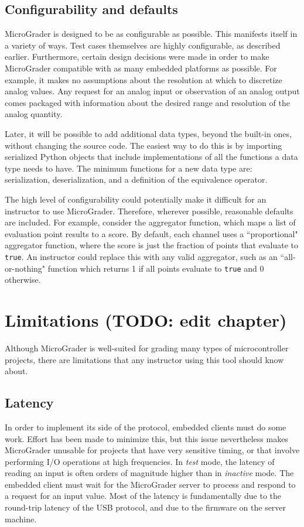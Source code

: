 \documentclass[12pt]{article}
\begin{document}
\subsection{Configurability and defaults}
\label{sec:config}
MicroGrader is designed to be as configurable as possible.  This manifests itself in a variety of ways.  Test cases themselves are highly configurable, as described earlier.  Furthermore, certain design decisions were made in order to make MicroGrader compatible with as many embedded platforms as possible.  For example, it makes no assumptions about the resolution at which to discretize analog values.  Any request for an analog input or observation of an analog output comes packaged with information about the desired range and resolution of the analog quantity.

Later, it will be possible to add additional data types, beyond the built-in ones, without changing the source code.  The easiest way to do this is by importing serialized \cite{pickle} Python objects that include implementations of all the functions a data type needs to have.  The minimum functions for a new data type are: serialization, deserialization, and a definition of the equivalence operator.

The high level of configurability could potentially make it difficult for an instructor to use MicroGrader.  Therefore, wherever possible, reasonable defaults are included.  For example, consider the aggregator function, which maps a list of evaluation point results to a score.  By default, each channel uses a ``proportional" aggregator function, where the score is just the fraction of points that evaluate to \texttt{true}.  An instructor could replace this with any valid aggregator, such as an ``all-or-nothing" function which returns 1 if all points evaluate to \texttt{true} and 0 otherwise.


\newpage
\section{Limitations (TODO: edit chapter)}
Although MicroGrader is well-suited for grading many types of microcontroller projects, there are limitations that any instructor using this tool should know about.

\subsection{Latency}
In order to implement its side of the protocol, embedded clients must do some work.  Effort has been made to minimize this, but this issue nevertheless makes MicroGrader unusable for projects that have very sensitive timing, or that involve performing I/O operations at high frequencies.  In \textit{test} mode, the latency of reading an input is often orders of magnitude higher than in \textit{inactive} mode.  The embedded client must wait for the MicroGrader server to process and respond to a request for an input value.  Most of the latency is fundamentally due to the round-trip latency of the USB protocol, and due to the firmware on the server machine.
\end{document}
